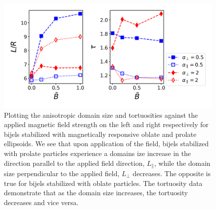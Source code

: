 \begin{figure} 
\centering 
\includegraphics[scale=0.5]{../figures/results/paper2/domain_size_aniso-field_on.png} 
\caption{Plotting the anisotropic domain size and tortuosities against the applied magnetic field strength on the left and right respectively for bijels stabilized with magnetically responsive oblate and prolate ellipsoids. We see that upon application of the field, bijels stabilized with prolate particles experience a domains ize increase in the direction parallel to the applied field direction, $L_{\parallel}$, while the domain size perpendicular to the applied field, $L_{\perp}$ decreases. The opposite is true for bijels stabilized with oblate particles. The tortuosity data demonstrate that as the domain size increases, the tortuosity decreases and vice versa.} 
\label{fig:domain_size_aniso-field_on} 
\end{figure}


